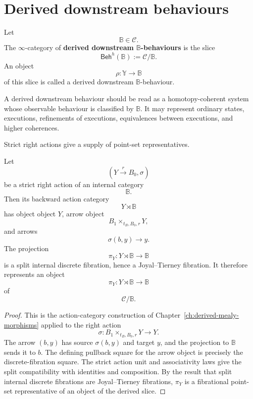 \section{Derived downstream behaviours}
\label{sec:derived-downstream-behaviours}

\begin{definition}
\label{def:derived-downstream-behaviour}
Let
\[
\mathbb B\in\mathcal C.
\]
The \(\infty\)-category of \textbf{derived downstream \(\mathbb B\)-behaviours}
is the slice
\[
\mathsf{Beh}^h(\mathbb B)
:=
\mathcal C/\mathbb B.
\]
An object
\[
\rho:\mathbb Y\to\mathbb B
\]
of this slice is called a derived downstream \(\mathbb B\)-behaviour.
\end{definition}

A derived downstream behaviour should be read as a homotopy-coherent system
whose observable behaviour is classified by \(\mathbb B\). It may represent
ordinary states, executions, refinements of executions, equivalences between
executions, and higher coherences.

Strict right actions give a supply of point-set representatives.

\begin{proposition}
\label{prop:strict-actions-derived-behaviours}
Let
\[
(Y\xrightarrow{r}B_0,\sigma)
\]
be a strict right action of an internal category
\[
\mathbb B.
\]
Then its backward action category
\[
Y\rtimes\mathbb B
\]
has object object \(Y\), arrow object
\[
B_1\times_{t_B,B_0,r}Y,
\]
and arrows
\[
\sigma(b,y)\longrightarrow y.
\]
The projection
\[
\pi_Y:Y\rtimes\mathbb B\to\mathbb B
\]
is a split internal discrete fibration, hence a Joyal--Tierney fibration. It
therefore represents an object
\[
\pi_Y:Y\rtimes\mathbb B\to\mathbb B
\]
of
\[
\mathcal C/\mathbb B.
\]
\end{proposition}

\begin{proof}
This is the action-category construction of
Chapter~\ref{ch:derived-mealy-morphisms} applied to the right action
\[
\sigma:B_1\times_{t_B,B_0,r}Y\to Y.
\]
The arrow \((b,y)\) has source \(\sigma(b,y)\) and target \(y\), and the
projection to \(\mathbb B\) sends it to \(b\). The defining pullback square
for the arrow object is precisely the discrete-fibration square. The strict
action unit and associativity laws give the split compatibility with
identities and composition. By the result that split internal discrete
fibrations are Joyal--Tierney fibrations, \(\pi_Y\) is a fibrational point-set
representative of an object of the derived slice.
\end{proof}

